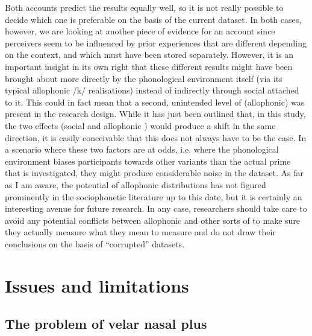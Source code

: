 Both accounts predict the results equally well, so it is not really possible to decide which one is preferable on the basis of the current dataset.
In both cases, however, we are looking at another piece of evidence for an  account since perceivers seem to be influenced by prior experiences that are different depending on the context, and which must have been stored separately.
However, it is an important insight in its own right that these different results might have been brought about more directly by the phonological environment itself (via its typical allophonic /k/ realisations) instead of indirectly through social  attached to it.
This could in fact mean that a second, unintended level of (allophonic)  was present in the research design.
While it has just been outlined that, in this study, the two effects (social  and allophonic ) would produce a shift in the same direction, it is easily conceivable that this does not always have to be the case.
In a scenario where these two factors are at odds, i.e. where the phonological environment biases participants towards other variants than the actual prime that is investigated, they might produce considerable noise in the dataset.
As far as I am aware, the  potential of allophonic distributions has not figured prominently in the sociophonetic literature up to this date, but it is certainly an interesting avenue for future research.
In any case, researchers should take care to avoid any potential conflicts between allophonic and other sorts of  to make sure they actually measure what they mean to measure and do not draw their conclusions on the basis of ``corrupted'' datasets.

	\section{Issues and limitations}
		\label{sec.perc_res.disc.issues}

		\subsection{The problem of velar nasal plus}

